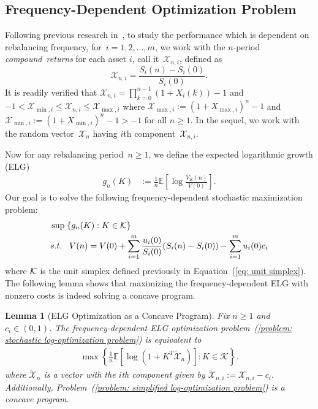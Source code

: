 \documentclass[10pt]{article} %
\newtheorem{lemma}{Lemma}[section]
\begin{document}
	\subsection[Frequency-Dependent Optimization Problem]{Frequency-Dependent Optimization Problem} 
	Following previous research in~\cite{hsieh2018rebalancing, hsieh2021necessary}, to study the performance which is dependent on rebalancing frequency, for~$i=1, 2, \ldots, m$, we work with the  $n$-period \textit{compound~returns} for each asset $i$, call it~$\mathcal{X}_{n,i}$, defined as
	\[
	\mathcal{X}_{n,i} = \frac{S_i(n) - S_i(0)}{S_i(0)}.
	\]
	It is readily verified that
	$
	\mathcal{X}_{n,i} = \prod_{k=0}^{n-1} (1+X_i(k)) -1
	$
	and
	$
	-1 < \mathcal{X}_{\min,i} \leq \mathcal{X}_{n,i} \leq \mathcal{X}_{\max, i} 
	$
	where $\mathcal{X}_{\max,i} := (1+X_{\max,i})^n -1 $ and $\mathcal{X}_{\min,i}:= (1 + X_{\min, i})^n -1 >-1 $ for all $n\geq 1.$
	In the sequel, we work with the random vector~$\mathcal{X}_n$ having $i$th component~$\mathcal{X}_{n,i}$.  
	
	Now for any rebalancing period~$n \geq 1$, we define the expected logarithmic growth (ELG) 
	\begin{align*}
		{g_n}(K) 
		&:=  \frac{1}{n}\mathbb{E}\left[ \log \frac{V_K(n)}{V(0)} \right].
	\end{align*}
	Our goal is to solve the following frequency-dependent stochastic maximization problem:
	\begin{align} \label{problem: stochastic log-optimization problem}
		&\sup \; \{g_n(K): K \in \mathcal{K}\}  \\
		&{\rm s.t.}  \;\;\; V(n) = V(0) + \sum_{i=1}^m \frac{u_i(0)}{S_i(0)} (S_i(n) - S_i(0))- \sum_{i=1}^m u_i(0)c_i \nonumber 
	\end{align}
	where $\cal K$ is the unit simplex defined previously in Equation~(\ref{eq: unit simplex}).
	The following lemma shows that maximizing the frequency-dependent ELG with nonzero costs is indeed solving a concave program.
	
	\begin{lemma}[ELG Optimization as a Concave Program] \label{lemma: ELG optimization as a concave program}
		Fix $n \geq 1$ and $c_i \in (0,1)$.
		The frequency-dependent ELG optimization problem~(\ref{problem: stochastic log-optimization problem}) 
		is equivalent to
		\begin{align} \label{problem: simplified log-optimization problem}
			\max \left\{ \frac{1}{n}\mathbb{E}\left[ {\log (1 + {K^T}{ \widetilde{\mathcal{X}}_n})} \right]: K \in \mathcal{K} \right\}. 
		\end{align}
		where $\widetilde{\mathcal{X}}_n$ is a vector with the $i$th component given by
		$
		\widetilde{\mathcal{X}}_{n,i} := \mathcal{X}_{n,i} - c_i.
		$
		Additionally,  Problem~(\ref{problem: simplified log-optimization problem}) is a concave program.
	\end{lemma}	
	
\end{document}
